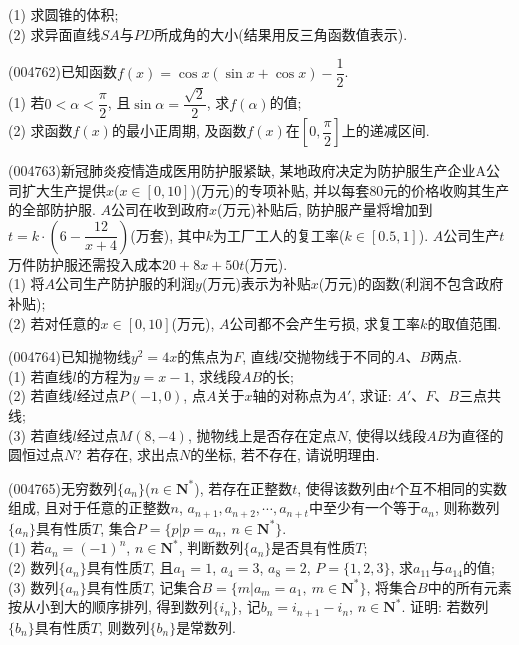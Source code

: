 (1) 求圆锥的体积;\\
(2) 求异面直线$SA$与$PD$所成角的大小(结果用反三角函数值表示).
\item (004762)已知函数$f(x)=\cos x(\sin x+\cos x)-\dfrac 12$.\\
(1) 若$0<\alpha <\dfrac{\pi}2$, 且$\sin \alpha =\dfrac{\sqrt 2}2$, 求$f(\alpha)$的值;\\
(2) 求函数$f(x)$的最小正周期, 及函数$f(x)$在$[0,\dfrac\pi 2]$上的递减区间.
\item (004763)新冠肺炎疫情造成医用防护服紧缺, 某地政府决定为防护服生产企业A公司扩大生产提供$x$($x\in [0,10]$)(万元)的专项补贴, 并以每套$80$元的价格收购其生产的全部防护服. $A$公司在收到政府$x$(万元)补贴后, 防护服产量将增加到$t=k\cdot (6-\dfrac{12}{x+4})$(万套), 其中$k$为工厂工人的复工率($k\in [0.5,1]$). $A$公司生产$t$万件防护服还需投入成本$20+8x+50t$(万元).\\
(1) 将$A$公司生产防护服的利润$y$(万元)表示为补贴$x$(万元)的函数(利润不包含政府补贴);\\
(2) 若对任意的$x\in [0,10]$(万元), $A$公司都不会产生亏损, 求复工率$k$的取值范围.
\item (004764)已知抛物线$y^2=4x$的焦点为$F$, 直线$l$交抛物线于不同的$A$、$B$两点.\\
(1) 若直线$l$的方程为$y=x-1$, 求线段$AB$的长;\\
(2) 若直线$l$经过点$P(-1,0)$, 点$A$关于$x$轴的对称点为$A'$, 求证: $A'$、$F$、$B$三点共线;\\
(3) 若直线$l$经过点$M(8,-4)$, 抛物线上是否存在定点$N$, 使得以线段$AB$为直径的圆恒过点$N$? 若存在, 求出点$N$的坐标, 若不存在, 请说明理由.
\item (004765)无穷数列$\{a_n\}$($n\in \mathbf{N}^*$), 若存在正整数$t$, 使得该数列由$t$个互不相同的实数组成, 且对于任意的正整数$n$, $a_{n+1},a_{n+2},\cdots,a_{n+t}$中至少有一个等于$a_n$, 则称数列$\{a_n\}$具有性质$T$, 集合$P=\{p|p=a_n, \ n\in \mathbf{N}^*\}$.\\
(1) 若$a_n=(-1)^n$, $n\in \mathbf{N}^*$, 判断数列$\{a_n\}$是否具有性质$T$;\\
(2) 数列$\{a_n\}$具有性质$T$, 且$a_1=1$, $a_4=3$, $a_8=2$, $P=\{1,2,3\}$, 求$a_{11}$与$a_{14}$的值;\\
(3) 数列$\{a_n\}$具有性质$T$, 记集合$B=\{m|a_m=a_1, \ m\in \mathbf{N}^*\}$, 将集合$B$中的所有元素按从小到大的顺序排列, 得到数列$\{i_n\}$, 记$b_n=i_{n+1}-i_n$, $n\in \mathbf{N}^*$. 证明: 若数列$\{b_n\}$具有性质$T$, 则数列$\{b_n\}$是常数列.
